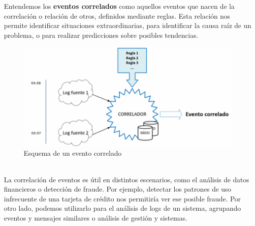 \documentclass[12pt,twoside]{article}
\begin{document}
Entendemos los \textbf{eventos correlados} como aquellos eventos que nacen de la correlación o relación de otros, definidos mediante reglas. Esta relación nos permite identificar situaciones extraordinarias, para identificar la causa raíz de un problema, o para realizar predicciones sobre posibles tendencias. \\
\begin{figure}[h]
    \centering
    \includegraphics[scale=0.5]{./imagenes/correlado}
    \caption{Esquema de un evento correlado}
\end{figure}\\

La correlación de eventos es útil en distintos escenarios, como el análisis de datos financieros o detección de fraude. Por ejemplo, detectar los patrones de uso infrecuente de una tarjeta de crédito nos permitiría ver ese posible fraude. Por otro lado, podemos utilizarlo para el análisis de logs de un sistema, agrupando eventos y mensajes similares o análisis de gestión y sistemas.\\
\end{document}
